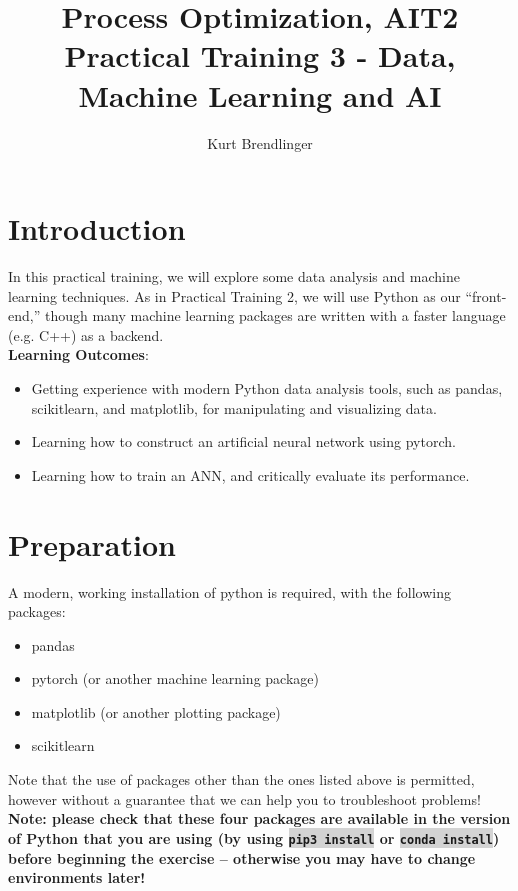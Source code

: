 \documentclass[11pt]{article}
\title{Process Optimization, AIT2\\
Practical Training 3 - Data, Machine Learning and AI}
\author{Kurt Brendlinger}
\newcommand{\code}[1]{\colorbox{lightgray}{\texttt{#1}}}
\begin{document}
\maketitle
\thispagestyle{empty}

\section{Introduction}

In this practical training, we will explore some data analysis and machine learning techniques.
As in Practical Training 2, we will use Python as our ``front-end,'' though many machine
learning packages are written with a faster language (e.g. C++) as a backend.\\

\textbf{Learning Outcomes}:
\begin{itemize}
\item Getting experience with modern Python data analysis tools, such as pandas, scikitlearn, and matplotlib, for manipulating and visualizing data.
\item Learning how to construct an artificial neural network using pytorch.
\item Learning how to train an ANN, and critically evaluate its performance.
\end{itemize}

\section{Preparation}

A modern, working installation of python is required, with the following packages:
\begin{itemize}
\item pandas
\item pytorch (or another machine learning package)
\item matplotlib (or another plotting package)
\item scikitlearn
\end{itemize}

Note that the use of packages other than the ones listed above is permitted, however without
a guarantee that we can help you to troubleshoot problems!\\

\textbf{Note: please check that these four packages are available in the version of Python
  that you are using (by using \code{pip3 install} or \code{conda install}) before beginning the
  exercise -- otherwise you may have to change environments later!}\\
\end{document}
